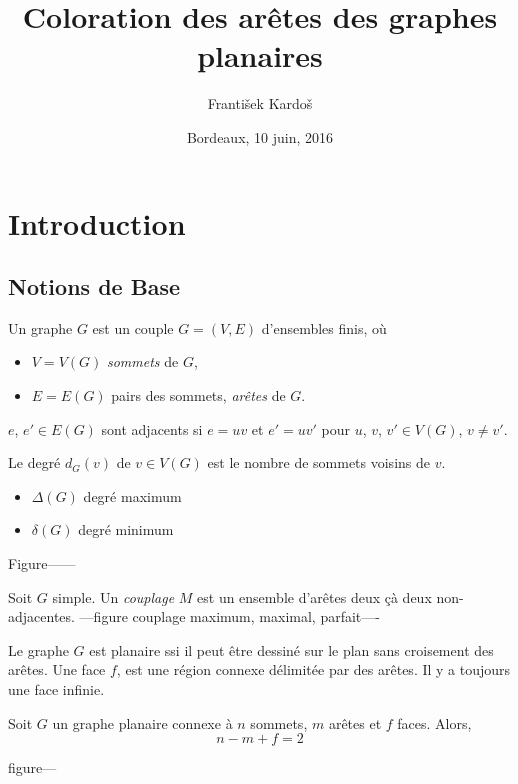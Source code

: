 \documentclass{beamer}
\title[Coloration des arêtes des graphes planaires]{Coloration des arêtes des graphes planaires}
\author[A. Gallastegui and F. Kardo\v s]{\underbar{Antonio Gallastegui} \and Franti\v sek Kardo\v s}
\institute[]{
Laboratoire Bordelais de Recherche Informatique \\
Université de Bordeaux\\
}
\date{Bordeaux, 10 juin, 2016}
\begin{document}
\begin{frame}
  \titlepage
\end{frame}
\begin{frame}
 \tableofcontents
\end{frame}
\section{Introduction}
\subsection{Notions de Base}
\begin{frame}
Un graphe $G$ est un couple $G=(V,E)$ d'ensembles finis, où
\begin{itemize}
\item $V=V(G)$ \emph{sommets} de $G$,
\item $E=E(G)$ pairs des sommets, \emph{arêtes} de $G$.
\end{itemize}
$e$, $e' \in E(G)$ sont adjacents si $e=uv$ et $e'=uv'$ pour $u$, $v$, $v' \in V(G)$, $v \neq v'$.

\pause

Le degré $d_G(v)$ de $v\in V(G)$ est le nombre de sommets voisins de $v$.
\begin{itemize}
\item $\Delta(G)$ degré maximum
\item $\delta(G)$ degré minimum
\end{itemize} 
Figure------
\end{frame}

\begin{frame}
Soit $G$ simple. Un \emph{couplage} $M$ est un ensemble d'arêtes deux çà deux non-adjacentes.
---figure couplage maximum, maximal, parfait----


\end{frame}

\begin{frame}
Le graphe $G$ est planaire ssi il peut être dessiné sur le plan sans croisement des arêtes.
Une face $f$, est une région connexe délimitée par des arêtes. Il y a toujours une face infinie.
\pause
\begin{theorem}[Euler, 1750]
Soit $G$ un graphe planaire connexe à $n$ sommets, $m$ arêtes et $f$ faces. Alors,
$$
n-m+f=2
$$
\end{theorem}
figure---
\end{frame}
\end{document}
